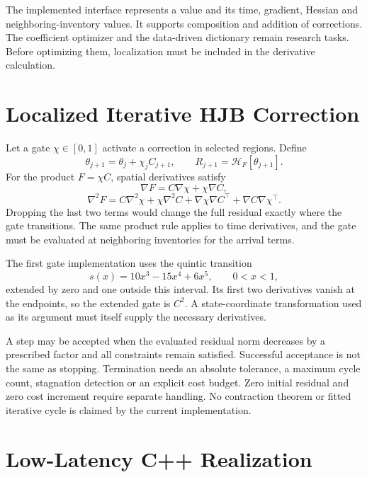 The implemented interface represents a value and its time, gradient, Hessian and neighboring-inventory values. It supports composition and addition of corrections. The coefficient optimizer and the data-driven dictionary remain research tasks. Before optimizing them, localization must be included in the derivative calculation.

\chapter{Localized Iterative HJB Correction}

Let a gate $\chi\in[0,1]$ activate a correction in selected regions. Define
\[
 \theta_{j+1}=\theta_j+\chi_j C_{j+1},\qquad
 R_{j+1}=\mathcal H_F[\theta_{j+1}].
\]
For the product $F=\chi C$, spatial derivatives satisfy
\[
 \nabla F=C\nabla\chi+\chi\nabla C,
\]
\[
 \nabla^2F=C\nabla^2\chi+\chi\nabla^2C
 +\nabla\chi\nabla C^\top+\nabla C\nabla\chi^\top.
\]
Dropping the last two terms would change the full residual exactly where the gate transitions. The same product rule applies to time derivatives, and the gate must be evaluated at neighboring inventories for the arrival terms.

The first gate implementation uses the quintic transition
\[
 s(x)=10x^3-15x^4+6x^5,\qquad 0<x<1,
\]
extended by zero and one outside this interval. Its first two derivatives vanish at the endpoints, so the extended gate is $C^2$. A state-coordinate transformation used as its argument must itself supply the necessary derivatives.

A step may be accepted when the evaluated residual norm decreases by a prescribed factor and all constraints remain satisfied. Successful acceptance is not the same as stopping. Termination needs an absolute tolerance, a maximum cycle count, stagnation detection or an explicit cost budget. Zero initial residual and zero cost increment require separate handling. No contraction theorem or fitted iterative cycle is claimed by the current implementation.

\chapter{Low-Latency C++ Realization}

